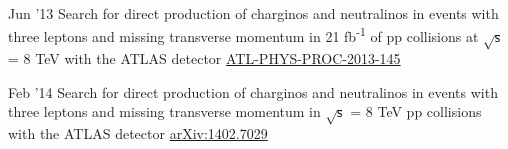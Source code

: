 \documentclass[]{cv} %
\begin{document}
\begin{entrylist}
  \entry
  {Jun '13}
  {{\normalfont Search for direct production of charginos and neutralinos in events with three leptons and missing transverse momentum in 21
    fb\textsuperscript{-1} of pp collisions at $\sqrt{\mathsf{s}}$ = 8 TeV with the ATLAS detector}}
  {\href{https://cds.cern.ch/record/1554811}{ATL-PHYS-PROC-2013-145}}
  {\vspace*{-9pt}}

  \entry
  {Feb '14}
  {{\normalfont Search for direct production of charginos and neutralinos in events with three leptons and missing transverse momentum in $\sqrt{\mathsf{s}}$ =
  8 TeV pp collisions with the ATLAS detector}}
  {\href{http://arxiv.org/abs/1402.7029}{arXiv:1402.7029}}
  {\vspace*{-9pt}}

\end{entrylist}

\ifinternalNotes
\end{document}
